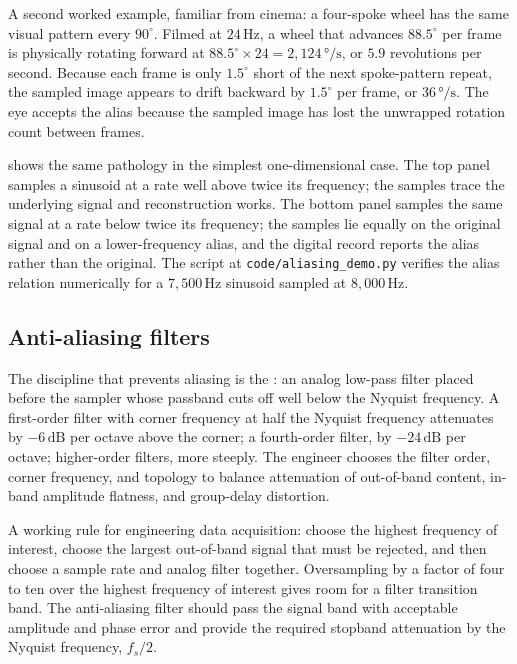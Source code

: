 A second worked example, familiar from cinema: a four-spoke wheel
has the same visual pattern every $90^{\circ}$. Filmed at $24
\,\si{\hertz}$, a wheel that advances $88.5^{\circ}$ per frame is
physically rotating forward at $88.5^{\circ} \times 24 = 2{,}124
\,\si{\degree\per\second}$, or $5.9$ revolutions per second. Because
each frame is only $1.5^{\circ}$ short of the next spoke-pattern
repeat, the sampled image appears to drift backward by $1.5^{\circ}$
per frame, or $36 \,\si{\degree\per\second}$. The eye accepts the
alias because the sampled image has lost the unwrapped rotation
count between frames.



 shows the same pathology in
the simplest one-dimensional case. The top panel samples a
sinusoid at a rate well above twice its frequency; the samples
trace the underlying signal and reconstruction works. The bottom
panel samples the same signal at a rate below twice its frequency;
the samples lie equally on the original signal and on a
lower-frequency alias, and the digital record reports the alias
rather than the original. The script at
\texttt{code/aliasing\_demo.py} verifies the alias relation
numerically for a $7{,}500 \,\si{\hertz}$ sinusoid sampled at $8{,}
000 \,\si{\hertz}$.

\subsection{Anti-aliasing filters}

The discipline that prevents aliasing is the
: an analog low-pass filter placed
before the sampler whose passband cuts off well below the Nyquist
frequency. A first-order filter with corner frequency at half the
Nyquist frequency attenuates by $-6 \,\text{dB}$ per octave above
the corner; a fourth-order filter, by $-24 \,\text{dB}$ per octave;
higher-order filters, more steeply. The engineer chooses the filter
order, corner frequency, and topology to balance attenuation of
out-of-band content, in-band amplitude flatness, and group-delay
distortion.

A working rule for engineering data acquisition: choose the highest
frequency of interest, choose the largest out-of-band signal that
must be rejected, and then choose a sample rate and analog filter
together. Oversampling by a factor of four to ten over the highest
frequency of interest gives room for a filter transition band. The
anti-aliasing filter should pass the signal band with acceptable
amplitude and phase error and provide the required stopband
attenuation by the Nyquist frequency, $f_{s}/2$.

